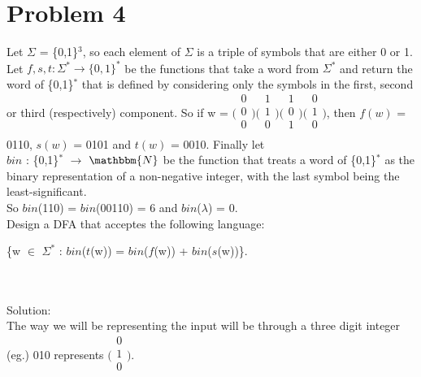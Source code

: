 \documentclass{article}
\newcommand*\moveToRight[1]{\hspace*{0em plus 1fill}\makebox{(#1)}}
\begin{document}
\section{Problem 4}
Let $\Sigma$ = \{0,1\}$^3$, so each element of $\Sigma$ is a triple of symbols that are either 0 or 1.\\ Let $f, s, t : \Sigma^* \to \{0, 1\}^*$ be the functions that take a word from $\Sigma^*$ and return the word of \{0,1\}$^*$ that is defined by considering only the symbols in the first, second or third (respectively) component. So if w = 
$\bigl(\begin{smallmatrix}
    0\\
    0\\
    0\\
\end{smallmatrix}\bigr)
\bigl(\begin{smallmatrix}
    1\\
    1\\
    0\\
\end{smallmatrix}\bigr)
\bigl(\begin{smallmatrix}
    1\\
    0\\
    1\\
\end{smallmatrix}\bigr)
\bigl(\begin{smallmatrix}
    0\\
    1\\
    0\\
\end{smallmatrix}\bigr)$, then $f(w)$ = 0110, $s(w)$ = 0101 and $t(w)$ = 0010. Finally let \\$bin$ : \{0,1\}$^*$ $\to$ $\mathbbm{N}$ be the function that treats a word of \{0,1\}$^*$ as the binary representation of a non-negative integer, with the last symbol being the least-significant.\\ So $bin$(110) = $bin$(00110) = 6 and $bin$($\lambda$) = 0.\\
Design a DFA that acceptes the following language:
\begin{center}
\{w $\in$ $\Sigma^*$ : $bin$($t$(w)) = $bin$($f$(w)) + $bin$($s$(w))\}.\\ \moveToRight{10 marks}\\    
\end{center}\\Solution:\\
The way we will be representing the input will be through a three digit integer (eg.) 010 represents $\bigl(\begin{smallmatrix}
    0\\
    1\\
    0\\
\end{smallmatrix}\bigr)$.\\
\end{document}
